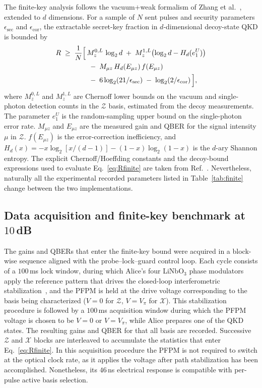 \documentclass[pra,aps,reprint,nofootinbib,superscriptaddress,floatfix]{revtex4-2}
\begin{document}
The finite-key analysis follows the vacuum$+$weak formalism of Zhang et al.~\cite{Zhang2017}, extended to $d$ dimensions. For a sample of $N$ sent pulses and security parameters $\epsilon_{\mathrm{sec}}$ and $\epsilon_{\mathrm{cor}}$, the extractable secret-key fraction in $d$-dimensional decoy-state QKD is bounded by
\begin{align}
R \;\ge\; \frac{1}{N}\Bigl[\,
& M_z^{0,L}\,\log_2 d
\;+\; M_z^{1,L}\!\left(\log_2 d - H_d(e_1^U)\right) \nonumber\\
& \;-\; M_{\mu z}\, H_d(E_{\mu z})\,f(E_{\mu z}) \nonumber\\
& \;-\; 6\log_2(21/\epsilon_{\mathrm{sec}})
\;-\; \log_2(2/\epsilon_{\mathrm{cor}}) \,\Bigr],
\label{eq:Rfinite}
\end{align}
where $M_z^{0,L}$ and $M_z^{1,L}$ are Chernoff lower bounds on the vacuum and single-photon detection counts in the $\mathcal{Z}$ basis, estimated from the decoy measurements. The parameter $e_1^U$ is the random-sampling upper bound on the single-photon error rate. $M_{\mu z}$ and $E_{\mu z}$ are the measured gain and QBER for the signal intensity $\mu$ in $\mathcal{Z}$. $f(E_{\mu z})$ is the error-correction inefficiency, and $H_d(x) = -x\log_2[x/(d-1)] - (1-x)\log_2(1-x)$ is the $d$-ary Shannon entropy. The explicit Chernoff/Hoeffding constants and the decoy-bound expressions used to evaluate Eq.~\eqref{eq:Rfinite} are taken from Ref.~\cite{dosSantos2026}. Nevertheless, naturally all the experimental recorded parameters listed in Table~\ref{tab:finite} change between the two implementations.

\subsection*{Data acquisition and finite-key benchmark at $10\,$dB}

The gains and QBERs that enter the finite-key bound were acquired in a block-wise sequence aligned with the probe--lock--guard control loop. Each cycle consists of a $100\,$ms lock window, during which Alice's four LiNbO$_3$ phase modulators apply the reference pattern that drives the closed-loop interferometric stabilization~\cite{dosSantos2026}, and the PFPM is held at the drive voltage corresponding to the basis being characterized ($V=0$ for $\mathcal{Z}$, $V=V_\pi$ for $\mathcal{X}$). This stabilization procedure is followed by a $100\,$ms acquisition window during which the PFPM voltage is chosen to be $V=0$ or $V=V_\pi$, while Alice prepares one of the QKD states. The resulting gains and QBER for that all basis are recorded. Successive $\mathcal{Z}$ and $\mathcal{X}$ blocks are interleaved to accumulate the statistics that enter Eq.~\eqref{eq:Rfinite}. In this acquisition procedure the PFPM is not required to switch at the optical clock rate, as it applies the voltage after path stabilization has been accomplished. Nonetheless, its $46\,$ns electrical response is compatible with per-pulse active basis selection.
\end{document}
